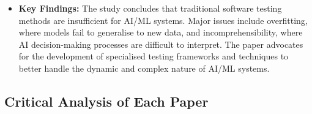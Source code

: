 \documentclass[12pt,a4paper]{article}
\begin{document}
\begin{itemize}
\begin{itemize}
        \item \textbf{Key Findings:} The study concludes that traditional software testing methods are insufficient for AI/ML systems. Major issues include overfitting, where models fail to generalise to new data, and incomprehensibility, where AI decision-making processes are difficult to interpret. The paper advocates for the development of specialised testing frameworks and techniques to better handle the dynamic and complex nature of AI/ML systems.

    \end{itemize}

\end{itemize}

\newpage
\subsection{Critical Analysis of Each Paper}
\end{document}

